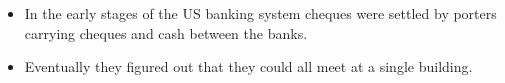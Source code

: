 \documentclass[20pt]{article}
\begin{document}
\begin{itemize}
    \item In the early stages of the US banking system cheques were settled by porters carrying cheques and cash between the banks.
    \item Eventually they figured out that they could all meet at a single building.
\end{itemize}

\end{document}
